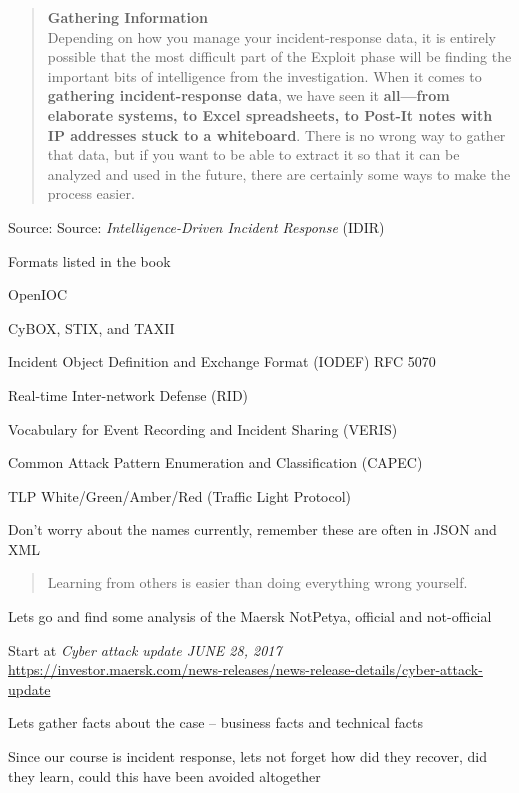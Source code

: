 \documentclass[Screen16to9,17pt]{foils}
\begin{document}


\begin{quote}
{\bf Gathering Information}\\
Depending on how you manage your incident-response data, it is entirely possible
that the most difficult part of the Exploit phase will be finding the important bits of
intelligence from the investigation. When it comes to {\bf gathering incident-response
data}, we have seen it {\bf all—from elaborate systems, to Excel spreadsheets, to Post-It
notes with IP addresses stuck to a whiteboard}. There is no wrong way to gather that
data, but if you want to be able to extract it so that it can be analyzed and used in the
future, there are certainly some ways to make the process easier.
\end{quote}
Source: Source: \emph{Intelligence-Driven Incident Response} (IDIR)



Formats listed in the book
\begin{list2}
\item OpenIOC
\item CyBOX, STIX, and TAXII
\item Incident Object Definition and Exchange Format (IODEF) RFC 5070
\item Real-time Inter-network Defense (RID)
\item Vocabulary for Event Recording and Incident Sharing (VERIS)
\item Common Attack Pattern Enumeration and Classification (CAPEC)
\item TLP White/Green/Amber/Red (Traffic Light Protocol)
\end{list2}

Don't worry about the names currently, remember these are often in JSON and XML



\begin{quote}
Learning from others is easier than doing everything wrong yourself.
\end{quote}

Lets go and find some analysis of the Maersk NotPetya, official and not-official
\begin{list2}
\item Start at \emph{Cyber attack update JUNE 28, 2017}\\
\url{https://investor.maersk.com/news-releases/news-release-details/cyber-attack-update}
\item Lets gather facts about the case -- business facts and technical facts
\item Since our course is incident response, lets not forget how did they recover, did they learn, could this have been avoided altogether
\end{list2}
\end{document}
